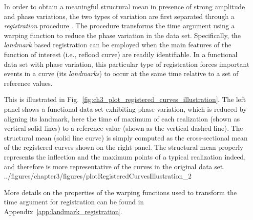 In order to obtain a meaningful structural mean in presence of strong amplitude and phase variations,
the two types of variation are first separated through a \emph{registration} procedure \cite{Wang1997,Ramsay1998}.
The procedure transforms the time argument using a warping function to reduce the phase variation in the data set.
Specifically, the \emph{landmark} based registration can be employed when the main features of the function of interest (i.e., reflood curve) are readily identifiable.
In a functional data set with phase variation, this particular type of registration forces important events in a curve (its \emph{landmarks}) to occur at the same time relative to a set of reference values.

This is illustrated in Fig.~\ref{fig:ch3_plot_registered_curves_illustration}.
The left panel shows a functional data set exhibiting phase variation, which is reduced by aligning its landmark, here the time of maximum of each realization (shown as vertical solid lines) to a reference value (shown as the vertical dashed line).
The structural mean (solid line curve) is simply computed as the cross-sectional mean of the registered curves shown on the right panel. 
The structural mean properly represents the inflection and the maximum points of a typical realization indeed, and therefore is more representative of the curves in the original data set.
{../figures/chapter3/figures/plotRegisteredCurvesIllustration_2}

More details on the properties of the warping functions used to transform the time argument for registration can be found in Appendix~\ref{app:landmark_registration}.

